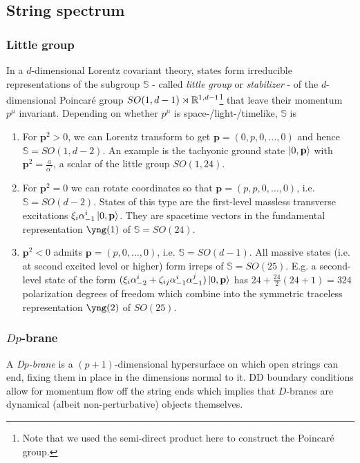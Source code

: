 \subsection{String spectrum}
\label{eq:stringSpectrumCanonical}
\subsubsection{Little group}
In a $d$-dimensional Lorentz covariant theory, states form irreducible representations of the subgroup $\mathbb{S}$ - called \emph{little group} or \emph{stabilizer} - of the $d$-dimensional Poincaré group $SO(1,d-1)\rtimes \mathbb{R}^{1,d-1}$\footnote{Note that we used the semi-direct product here to construct the Poincaré group.} that leave their momentum $p^\mu$ invariant. Depending on whether $p^\mu$ is space-/light-/timelike, $\mathbb{S}$ is 
\begin{enumerate}
	\item For $\mathbf{p}^2>0$, we can Lorentz transform to get $\mathbf{p}=(0,p,0,\dots,0)$ and hence $\mathbb{S}=SO(1,d-2)$. An example is the tachyonic ground state $\ket{0,\mathbf{p}}$ with $\mathbf{p}^2= \frac{a}{\alpha^\prime}$, a scalar of the little group $SO(1,24)$.
	\item For $\mathbf{p}^2=0$ we can rotate coordinates so that $\mathbf{p}=(p,p,0,\dots,0)$, i.e. $\mathbb{S}=SO(d-2)$. States of this type are the first-level massless transverse excitations $\xi_i \alpha^i_{-1}\ket{0,\mathbf{p}}$. They are spacetime vectors in the fundamental representation $\yng(1)$ of $\mathbb{S}=SO(24)$.
	\item $\mathbf{p}^2<0$ admits $\mathbf{p}=(p,0,\dots,0)$, i.e. $\mathbb{S}=SO(d-1)$. All massive states (i.e. at second excited level or higher) form irreps of $\mathbb{S}=SO(25)$. E.g. a second-level state of the form $(\xi_i \alpha^i_{-2}+\zeta_{ij} \alpha^i_{-1} \alpha^j_{-1})\ket{0,\mathbf{p}}$ has $24+\frac{24}{2}(24+1)=324$ polarization degrees of freedom which combine into the symmetric traceless representation $\yng(2)$ of $SO(25)$.
\end{enumerate}
\subsubsection{$Dp$-brane}
A \emph{D$p$-brane} is a $(p+1)$-dimensional hypersurface on which open strings can end, fixing them in place in the dimensions normal to it. DD boundary conditions allow for momentum flow off the string ends which implies that $D$-branes are dynamical (albeit non-perturbative) objects themselves.
